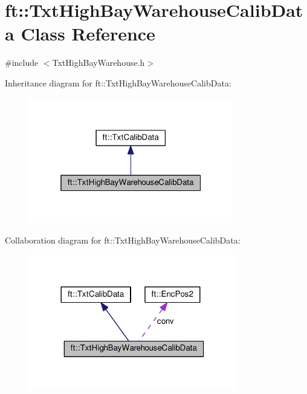 \hypertarget{classft_1_1_txt_high_bay_warehouse_calib_data}{}\section{ft\+:\+:Txt\+High\+Bay\+Warehouse\+Calib\+Data Class Reference}
\label{classft_1_1_txt_high_bay_warehouse_calib_data}


{\ttfamily \#include $<$Txt\+High\+Bay\+Warehouse.\+h$>$}



Inheritance diagram for ft\+:\+:Txt\+High\+Bay\+Warehouse\+Calib\+Data\+:
\nopagebreak
\begin{figure}[H]
\begin{center}
\leavevmode
\includegraphics[width=253pt]{classft_1_1_txt_high_bay_warehouse_calib_data__inherit__graph}
\end{center}
\end{figure}


Collaboration diagram for ft\+:\+:Txt\+High\+Bay\+Warehouse\+Calib\+Data\+:
\nopagebreak
\begin{figure}[H]
\begin{center}
\leavevmode
\includegraphics[width=257pt]{classft_1_1_txt_high_bay_warehouse_calib_data__coll__graph}
\end{center}
\end{figure}
